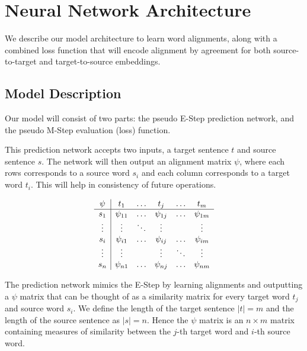 \documentclass[twoside,twocolumn]{article}
\begin{document}

\section{Neural Network Architecture}

We describe our model architecture to learn word alignments, along with
a combined loss function that will encode alignment by
agreement for both source-to-target and target-to-source embeddings.



\subsection{Model Description}

Our model will consist of two parts: the pseudo E-Step prediction network, and
the pseudo M-Step evaluation (loss) function.

This prediction network accepts two inputs, a target sentence $t$ and source
sentence $s$. The network will then output an alignment matrix $\psi$, where
each rows corresponds to a source word $s_i$ and each column corresponds to a
target word $t_i$. This will help in consistency of future operations.

\begin{equation}
  \centering
\begin{array}{c|ccccc}
\psi & t_1       & \hdots & t_j       & \hdots & t_m       \\ \hline
s_1  & \psi_{11} & \hdots & \psi_{1j} & \hdots & \psi_{1m} \\
\vdots  & \vdots & \ddots & \vdots &  & \vdots \\
s_i  & \psi_{i1} & \hdots & \psi_{ij} & \hdots & \psi_{im} \\
\vdots  & \vdots &  & \vdots & \ddots & \vdots \\
s_n  & \psi_{n1} & \hdots & \psi_{nj} & \hdots & \psi_{nm}
\end{array}
\end{equation}

The prediction network mimics the E-Step by learning alignments and outputting
a $\psi$ matrix that can be thought of as a similarity matrix for every target
word $t_j$ and source word $s_i$. We define the length of the target sentence
$|t| = m$ and the length of the source sentence as $|s|=n$. Hence the $\psi$
matrix is an $n \times m$ matrix containing measures of similarity between the
$j$-th target word and $i$-th source word.
\end{document}
